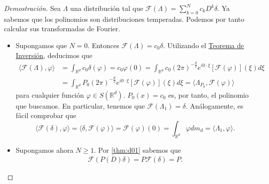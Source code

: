 \begin{proof}[Demostración]
Sea $\Lambda$ una distribución tal que $\mathcal{F}(\Lambda)=\sum_{k=0}^{N}c_{k}D^{k}\delta$. 
Ya sabemos que los polinomios son distribuciones temperadas. Podemos por tanto calcular sus transformadas de Fourier.  
\begin{itemize}
\item Supongamos que $N=0$. Entonces $
\mathcal{F}(\Lambda)=c_{0}\delta$. Utilizando el \hyperref[thm:d07]{Teorema de Inversión}, deducimos que 
\begin{align*}
\langle \mathcal{F}(\Lambda), \varphi \rangle & =  \int_{\mathds{R}^{d}} c_{0}\delta(\varphi)
= c_{0}\varphi (0) =  \int_{\mathds{R}^{d}}c_{0}(2\pi)^{-\frac{d}{2}} e^{i0\cdot \xi}[\mathcal{F}(\varphi)](\xi) d\xi 
\\ & =  \int_{\mathds{R}^{d}}P_{0}(2\pi)^{-\frac{d}{2}} e^{i0\cdot \xi}[\mathcal{F}(\varphi)](\xi) d\xi = 
\langle \Lambda_{P_{0}}, \mathcal{F}(\varphi) \rangle 
\end{align*}
para cualquier función $\varphi\in S(\mathds{R}^{d})$.  $P_{0}(x)=c_{0}$ es, por tanto, el polinomio  que buscamos. En particular, tenemos que $\mathcal{F}(\Lambda_{1}) = \delta$. Análogamente, es fácil comprobar que
\begin{equation}
\langle \mathcal{F}(\delta),\varphi\rangle = \langle \delta,\mathcal{F}(\varphi)\rangle = \mathcal{F}(\varphi)(0) = \int_{\mathds{R}^{d}}\varphi dm_{d} = \langle \Lambda_{1},\varphi \rangle.
\end{equation}
\item Supongamos ahora $N\geq 1$. Por \autoref{thm:d01}
 sabemos que 
\begin{gather}
\mathcal{F}(P(D)\delta) = P\mathcal{F}(\delta) = P.
\end{gather}
\end{itemize}
\end{proof}